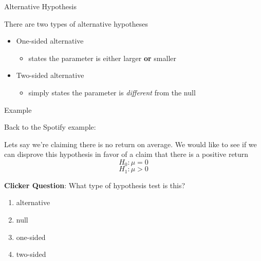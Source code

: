 \documentclass{beamer}
\begin{document}

\begin{frame}{Alternative Hypothesis}
	
	There are two types of alternative hypotheses
	
	\begin{itemize}
		\item One-sided alternative
		      \begin{itemize}
		      	\item states the parameter is either larger \textbf{or} smaller 
		      \end{itemize}
		      
		\item Two-sided alternative
		      \begin{itemize}
		      	\item simply states the parameter is \textit{different} from the null
		      \end{itemize}
	\end{itemize}
	
\end{frame} 

\begin{frame}{Example}
	
	Back to the Spotify example:
	
	Lets say we're claiming there is no return on average. We would like to see if we can disprove this hypothesis in favor of a claim that there is a positive return
	$$H_0: \mu=0$$
	$$H_1: \mu > 0$$
	
	\textbf{Clicker Question}: What type of hypothesis test is this?
	\begin{enumerate}[label=(\alph*)]
		\item alternative
		\item null
		\item one-sided
		\item two-sided
	\end{enumerate}
	
\end{frame}
\end{document}
